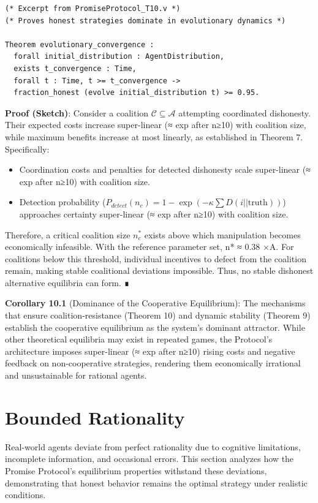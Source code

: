 \documentclass[11pt]{article}
\begin{document}
\begin{verbatim}
(* Excerpt from PromiseProtocol_T10.v *)
(* Proves honest strategies dominate in evolutionary dynamics *)

Theorem evolutionary_convergence :
  forall initial_distribution : AgentDistribution,
  exists t_convergence : Time,
  forall t : Time, t >= t_convergence ->
  fraction_honest (evolve initial_distribution t) >= 0.95.
\end{verbatim}

\textbf{Proof (Sketch)}:
Consider a coalition \(\mathcal{C} \subseteq \mathcal{A}\) attempting coordinated dishonesty. Their expected costs increase super-linear (≈ exp after n≥10) with coalition size, while maximum benefits increase at most linearly, as established in Theorem 7. Specifically:

\begin{itemize}
\item Coordination costs and penalties for detected dishonesty scale super-linear (≈ exp after n≥10) with coalition size.
\item Detection probability (\(P_{detect}(n_c) = 1 - \exp(-\kappa \sum D(i||\text{truth}))\)) approaches certainty super-linear (≈ exp after n≥10) with coalition size.
\end{itemize}

Therefore, a critical coalition size \(n_c^*\) exists above which manipulation becomes economically infeasible. With the reference parameter set, n* ≈ 0.38 ×A. For coalitions below this threshold, individual incentives to defect from the coalition remain, making stable coalitional deviations impossible. Thus, no stable dishonest alternative equilibria can form. ∎

\textbf{Corollary 10.1} (Dominance of the Cooperative Equilibrium):
The mechanisms that ensure coalition-resistance (Theorem 10) and dynamic stability (Theorem 9) establish the cooperative equilibrium as the system's dominant attractor. While other theoretical equilibria may exist in repeated games, the Protocol's architecture imposes super-linear (≈ exp after n≥10) rising costs and negative feedback on non-cooperative strategies, rendering them economically irrational and unsustainable for rational agents.
\section{Bounded Rationality}
\label{sec:org3455b8a}
Real-world agents deviate from perfect rationality due to cognitive limitations, incomplete information, and occasional errors. This section analyzes how the Promise Protocol's equilibrium properties withstand these deviations, demonstrating that honest behavior remains the optimal strategy under realistic conditions.
\end{document}
